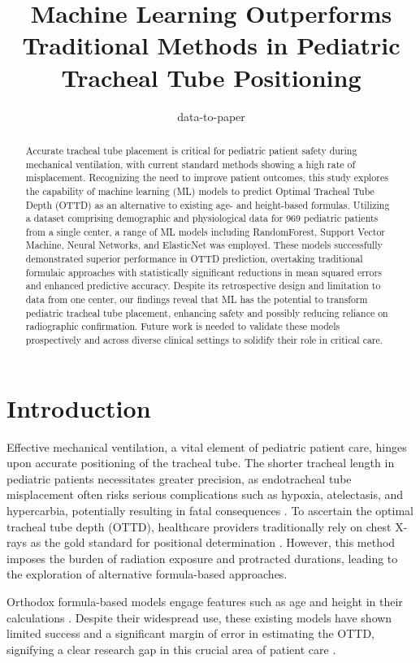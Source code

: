 \documentclass[11pt]{article}
\title{Machine Learning Outperforms Traditional Methods in Pediatric Tracheal Tube Positioning}
\author{data-to-paper}
\begin{document}
\maketitle
\begin{abstract}
Accurate tracheal tube placement is critical for pediatric patient safety during mechanical ventilation, with current standard methods showing a high rate of misplacement. Recognizing the need to improve patient outcomes, this study explores the capability of machine learning (ML) models to predict Optimal Tracheal Tube Depth (OTTD) as an alternative to existing age- and height-based formulas. Utilizing a dataset comprising demographic and physiological data for 969 pediatric patients from a single center, a range of ML models including RandomForest, Support Vector Machine, Neural Networks, and ElasticNet was employed. These models successfully demonstrated superior performance in OTTD prediction, overtaking traditional formulaic approaches with statistically significant reductions in mean squared errors and enhanced predictive accuracy. Despite its retrospective design and limitation to data from one center, our findings reveal that ML has the potential to transform pediatric tracheal tube placement, enhancing safety and possibly reducing reliance on radiographic confirmation. Future work is needed to validate these models prospectively and across diverse clinical settings to solidify their role in critical care.
\end{abstract}
\section*{Introduction}

Effective mechanical ventilation, a vital element of pediatric patient care, hinges upon accurate positioning of the tracheal tube. The shorter tracheal length in pediatric patients necessitates greater precision, as endotracheal tube misplacement often risks serious complications such as hypoxia, atelectasis, and hypercarbia, potentially resulting in fatal consequences \cite{Kollef1994EndotrachealTM, Cook2005ThePL}. To ascertain the optimal tracheal tube depth (OTTD), healthcare providers traditionally rely on chest X-rays as the gold standard for positional determination \cite{Kerrey2009APC, Rajajee2011RealtimeUP}. However, this method imposes the burden of radiation exposure and protracted durations, leading to the exploration of alternative formula-based approaches. 

Orthodox formula-based models engage features such as age and height in their calculations \cite{Mariano2005ACO, Weiss2005AppropriatePO}. Despite their widespread use, these existing models have shown limited success and a significant margin of error in estimating the OTTD, signifying a clear research gap in this crucial area of patient care \cite{Mariano2005ACO, Weiss2005AppropriatePO}.
\end{document}
